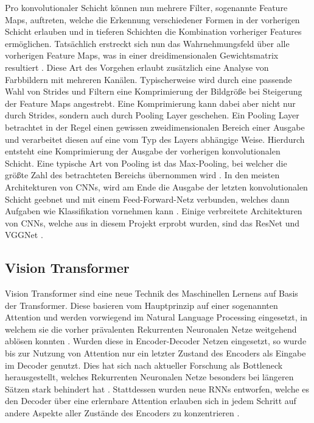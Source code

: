 \documentclass[twoside,a4paper]{IEEEtran}
\begin{document}
Pro konvolutionaler Schicht können nun mehrere Filter, sogenannte Feature Maps, auftreten, welche die Erkennung verschiedener Formen in der vorherigen Schicht erlauben und in tieferen Schichten die Kombination vorheriger Features ermöglichen. Tatsächlich erstreckt sich nun das Wahrnehmungsfeld über alle vorherigen Feature Maps, was in einer dreidimensionalen Gewichtsmatrix resultiert \cite[S.364-365]{MACHINE_LEARNING}. Diese Art des Vorgehen erlaubt zusätzlich eine Analyse von Farbbildern mit mehreren Kanälen. Typischerweise wird durch eine passende Wahl von Strides und Filtern eine Komprimierung der Bildgröße bei Steigerung der Feature Maps angestrebt. Eine Komprimierung kann dabei aber nicht nur durch Strides, sondern auch durch Pooling Layer geschehen. Ein Pooling Layer betrachtet in der Regel einen gewissen zweidimensionalen Bereich einer Ausgabe und verarbeitet diesen auf eine vom Typ des Layers abhängige Weise. Hierdurch entsteht eine Komprimierung der Ausgabe der vorherigen konvolutionalen Schicht. Eine typische Art von Pooling ist das Max-Pooling, bei welcher die größte Zahl des betrachteten Bereichs übernommen wird \cite[S.369-370]{MACHINE_LEARNING}. In den meisten Architekturen von CNNs, wird am Ende die Ausgabe der letzten konvolutionalen Schicht geebnet und mit einem Feed-Forward-Netz verbunden, welches dann Aufgaben wie Klassifikation vornehmen kann \cite[S.371]{MACHINE_LEARNING}. Einige verbreitete Architekturen von CNNs, welche aus in diesem Projekt erprobt wurden, sind das ResNet und VGGNet \cite[S.378-381]{MACHINE_LEARNING}.

\subsection{Vision Transformer} %

Vision Transformer sind eine neue Technik des Maschinellen Lernens auf Basis der Transformer. Diese basieren vom Hauptprinzip auf einer sogenannten Attention und werden vorwiegend im Natural Language Processing eingesetzt, in welchem sie die vorher prävalenten Rekurrenten Neuronalen Netze weitgehend ablösen konnten \cite{TRANSFORMERS}. Wurden diese in Encoder-Decoder Netzen eingesetzt, so wurde bis zur Nutzung von Attention nur ein letzter Zustand des Encoders als Eingabe im Decoder genutzt. Dies hat sich nach aktueller Forschung als Bottleneck herausgestellt, welches Rekurrenten Neuronalen Netze besonders bei längeren Sätzen stark behindert hat \cite[S.2]{TRANSFORMERS}. Stattdessen wurden neue RNNs entworfen, welche es den Decoder über eine erlernbare Attention erlauben sich in jedem Schritt auf andere Aspekte aller Zustände des Encoders zu konzentrieren \cite[S.4]{RNN_ATTENTION}.  
\end{document}
